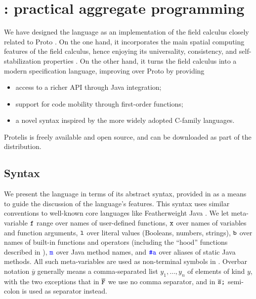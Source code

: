 \documentclass[12pt,a4paper,twoside,openright]{book}
\begin{document}

\chapter{\protelis{}: practical aggregate programming}
\label{protelis-language}
We have designed the \protelis{} language as an implementation of the field calculus \cite{VDB-FOCLASA-CIC2013} closely related to Proto \cite{proto}.
%
On the one hand, it incorporates the main spatial computing features of the field calculus, hence enjoying its universality, consistency, and self-stabilization properties \cite{BVD-SCW14,VD-COORD2014-LNCS2014}.
%
On the other hand, it turns the field calculus into a modern specification language, improving over Proto by providing
\begin{itemize}
 \item access to a richer API through Java integration;
 \item support for code mobility through first-order functions;
 \item a novel syntax inspired by the more widely adopted C-family languages.
\end{itemize}

Protelis is freely available and open source, and can be downloaded as part of the \alchemist{} distribution.

\section{Syntax}

We present the \protelis{} language in terms of its abstract syntax, provided in  as a means to guide the discussion of the language's features.
%
This syntax uses similar conventions to well-known core languages like Featherweight Java \cite{FJ}.
%
We let meta-variable $\texttt{f}$ range over names of user-defined functions, $\texttt{x}$ over names of variables and function arguments, $\texttt{l}$ over literal values (Booleans, numbers, strings), $\texttt{b}$ over names of built-in functions and operators (including the ``hood'' functions described in ), $\textcolor{blue}{\texttt{m}}$ over Java method names, and $\textcolor{blue}{\texttt{\#a}}$ over aliases of static Java methods.
%
All such meta-variables are used as non-terminal symbols in .
%
Overbar notation $\overline{y}$ generally means a comma-separated list $y_1,\ldots,y_n$ of elements of kind $y$, with the two exceptions that in $\overline{\texttt{F}}$ we use no comma separator, and in $\overline{\texttt{s}}\texttt{;}$ semi-colon is used as separator instead.
\end{document}
